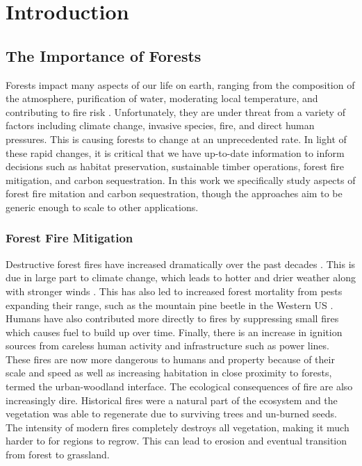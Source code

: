
\chapter{Introduction} \label{chapIntroduction}
\section{The Importance of Forests}

Forests impact many aspects of our life on earth, ranging from the composition of the atmosphere, purification of water, moderating local temperature, and contributing to fire risk \cite{IPCC2019ClimateReport}. Unfortunately, they are under threat from a variety of factors including climate change, invasive species, fire, and direct human pressures. This is causing forests to change at an unprecedented rate. In light of these rapid changes, it is critical that we have up-to-date information to inform decisions such as habitat preservation, sustainable timber operations, forest fire mitigation, and carbon sequestration. In this work we specifically study aspects of forest fire mitation and carbon sequestration, though the approaches aim to be generic enough to scale to other applications. 

\subsection{Forest Fire Mitigation} 
Destructive forest fires have increased dramatically over the past decades \cite{spreading_like_wildfire, ayanz2021, nfn2022}. This is due in large part to climate change, which leads to hotter and drier weather along with stronger winds \cite{spreading_like_wildfire}. This has also led to increased forest mortality from pests expanding their range, such as the mountain pine beetle in the Western US \cite{Jenkins2014AndFuels}. Humans have also contributed more directly to fires by suppressing small fires which causes fuel to build up over time. Finally, there is an increase in ignition sources from careless human activity and infrastructure such as power lines. These fires are now more dangerous to humans and property because of their scale and speed as well as increasing habitation in close proximity to forests, termed the urban-woodland interface. The ecological consequences of fire are also increasingly dire. Historical fires were a natural part of the ecosystem and the vegetation was able to regenerate due to surviving trees and un-burned seeds. The intensity of modern fires completely destroys all vegetation, making it much harder to for regions to regrow. This can lead to erosion and eventual transition from forest to grassland.


